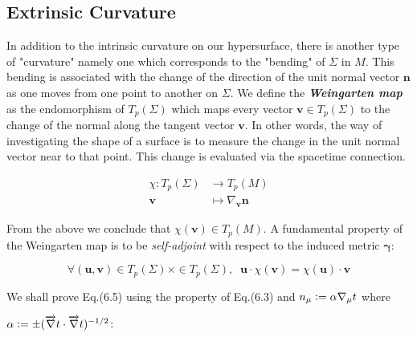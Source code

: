 \documentclass[12pt]{article}
\renewcommand{\vec}[1]{\bm{#1}}
\numberwithin{equation}{section}
\numberwithin{theorem}{subsection}
\newcommand{\defeq}{\vcentcolon=}
\begin{document}
\subsection{Extrinsic Curvature}

In addition to the intrinsic curvature on our hypersurface, there is another type of "curvature" namely one which corresponds to the "bending" of $\Sigma$ in $M$. This bending is associated with the change of the direction of the unit normal vector $\vec{n}$ as one moves from one point to another on $\Sigma$. We define the \textbf{\textit{Weingarten map}} as the endomorphism of $T_{p}(\Sigma)$ which maps every vector $\vec{v} \in T_{p}(\Sigma)$ to the change of the normal along the tangent vector $\vec{v}$. In other words, the way of investigating the shape of a surface is to measure the change in the unit normal vector near to that point. This change is evaluated via the spacetime connection.

\begin{align*}

    \chi \colon T_{p}(\Sigma) &\to T_{p}(M) \\

    \vec{v} &\mapsto \nabla_{\vec{v}}\vec{n}

\end{align*}

From the above we conclude that $\chi(\vec{v}) \in T_{p}(M)$. \newline A fundamental property of the Weingarten map is to be \textit{self-adjoint} with respect to the induced metric $\vec{\gamma}$:

\begin{equation}

    \boxed{\forall (\vec{u},\vec{v}) \in T_{p}(\Sigma) \times \in T_{p}(\Sigma), \; \; \vec{u} \cdot \chi(\vec{v}) = \chi(\vec{u}) \cdot \vec{v}}

\end{equation}

We shall prove Eq.(6.5) using the property of Eq.(6.3) and  $n_{\mu} \defeq \alpha \nabla_{\mu}t$ where

\newline $\alpha \defeq \pm (\overrightarrow{\nabla}t \cdot \overrightarrow{\nabla}t)^{-1/2}$: 
\end{document}
